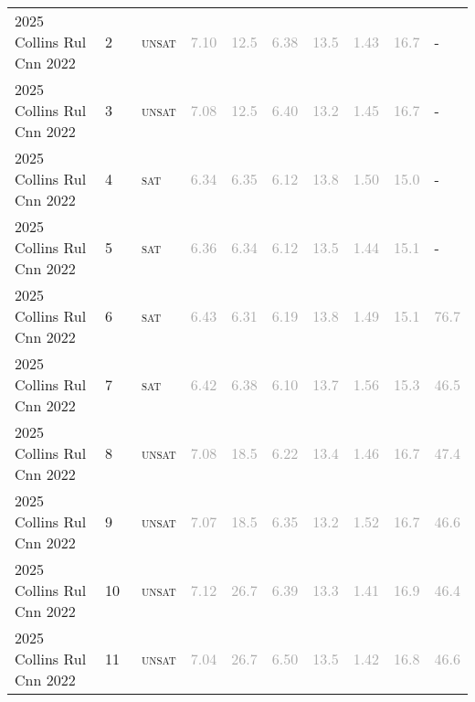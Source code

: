 \begin{center}
{\begin{longtable}{@{}llllllllll@{}}
2025 Collins Rul Cnn 2022 & 2 & ~\textsc{unsat} & \textcolor{darkgray}{7.10} & \textcolor{darkgray}{12.5} & \textcolor{darkgray}{6.38} & \textcolor{darkgray}{13.5} & \textcolor{darkgray}{1.43} & \textcolor{darkgray}{16.7} & - \\
2025 Collins Rul Cnn 2022 & 3 & ~\textsc{unsat} & \textcolor{darkgray}{7.08} & \textcolor{darkgray}{12.5} & \textcolor{darkgray}{6.40} & \textcolor{darkgray}{13.2} & \textcolor{darkgray}{1.45} & \textcolor{darkgray}{16.7} & - \\
2025 Collins Rul Cnn 2022 & 4 & ~\textsc{sat} & \textcolor{darkgray}{6.34} & \textcolor{darkgray}{6.35} & \textcolor{darkgray}{6.12} & \textcolor{darkgray}{13.8} & \textcolor{darkgray}{1.50} & \textcolor{darkgray}{15.0} & - \\
2025 Collins Rul Cnn 2022 & 5 & ~\textsc{sat} & \textcolor{darkgray}{6.36} & \textcolor{darkgray}{6.34} & \textcolor{darkgray}{6.12} & \textcolor{darkgray}{13.5} & \textcolor{darkgray}{1.44} & \textcolor{darkgray}{15.1} & - \\
2025 Collins Rul Cnn 2022 & 6 & ~\textsc{sat} & \textcolor{darkgray}{6.43} & \textcolor{darkgray}{6.31} & \textcolor{darkgray}{6.19} & \textcolor{darkgray}{13.8} & \textcolor{darkgray}{1.49} & \textcolor{darkgray}{15.1} & \textcolor{darkgray}{76.7} \\
2025 Collins Rul Cnn 2022 & 7 & ~\textsc{sat} & \textcolor{darkgray}{6.42} & \textcolor{darkgray}{6.38} & \textcolor{darkgray}{6.10} & \textcolor{darkgray}{13.7} & \textcolor{darkgray}{1.56} & \textcolor{darkgray}{15.3} & \textcolor{darkgray}{46.5} \\
2025 Collins Rul Cnn 2022 & 8 & ~\textsc{unsat} & \textcolor{darkgray}{7.08} & \textcolor{darkgray}{18.5} & \textcolor{darkgray}{6.22} & \textcolor{darkgray}{13.4} & \textcolor{darkgray}{1.46} & \textcolor{darkgray}{16.7} & \textcolor{darkgray}{47.4} \\
2025 Collins Rul Cnn 2022 & 9 & ~\textsc{unsat} & \textcolor{darkgray}{7.07} & \textcolor{darkgray}{18.5} & \textcolor{darkgray}{6.35} & \textcolor{darkgray}{13.2} & \textcolor{darkgray}{1.52} & \textcolor{darkgray}{16.7} & \textcolor{darkgray}{46.6} \\
2025 Collins Rul Cnn 2022 & 10 & ~\textsc{unsat} & \textcolor{darkgray}{7.12} & \textcolor{darkgray}{26.7} & \textcolor{darkgray}{6.39} & \textcolor{darkgray}{13.3} & \textcolor{darkgray}{1.41} & \textcolor{darkgray}{16.9} & \textcolor{darkgray}{46.4} \\
2025 Collins Rul Cnn 2022 & 11 & ~\textsc{unsat} & \textcolor{darkgray}{7.04} & \textcolor{darkgray}{26.7} & \textcolor{darkgray}{6.50} & \textcolor{darkgray}{13.5} & \textcolor{darkgray}{1.42} & \textcolor{darkgray}{16.8} & \textcolor{darkgray}{46.6} \\

\end{longtable}}
\end{center}

